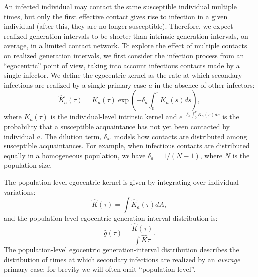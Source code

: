\documentclass[12pt]{article}
\begin{document}
An infected individual may contact the same susceptible individual multiple times, but only the first effective contact gives rise to infection in a given individual (after this, they are no longer susceptible).
Therefore, we expect realized generation intervals to be shorter than intrinsic generation intervals, on average, in a limited contact network.
To explore the effect of multiple contacts on realized generation intervals, we first consider the infection process from an ``egocentric'' point of view, taking into account infectious contacts made by a single infector.
We define the egocentric kernel as the rate at which secondary infections are realized by a single primary case $a$ in the absence of other infectors:
\begin{equation}
\hat{K}_a(\tau) = K_a(\tau) \exp \left(- \delta_a \int_0^\tau K_a(s) ds\right),
\end{equation}
where $K_a(\tau)$ is the individual-level intrinsic kernel and $e^{- \delta_a \int_0^\tau K_a(s) ds}$ is the probability that a susceptible acquaintance has not yet been contacted by individual $a$.
The dilution term, $\delta_a$, models how contacts are distributed among susceptible acquaintances.
For example, when infectious contacts are distributed equally in a homogeneous population, we have $\delta_a = 1/(N-1)$, where $N$ is the population size.

The population-level egocentric kernel is given by integrating over individual variations:
\begin{equation}
\hat{K}(\tau) = \int \hat{K}_a(\tau) dA,
\end{equation}
and the population-level egocentric generation-interval distribution is:
\begin{equation}
\hat{g}(\tau) = \frac{\hat{K}(\tau)}{\int \hat{K} \tau}.
\label{eq:conditional}
\end{equation}
The population-level egocentric generation-interval distribution describes the distribution of times at which secondary infections are realized by an \emph{average} primary case; for brevity we will often omit ``population-level''.
\end{document}
